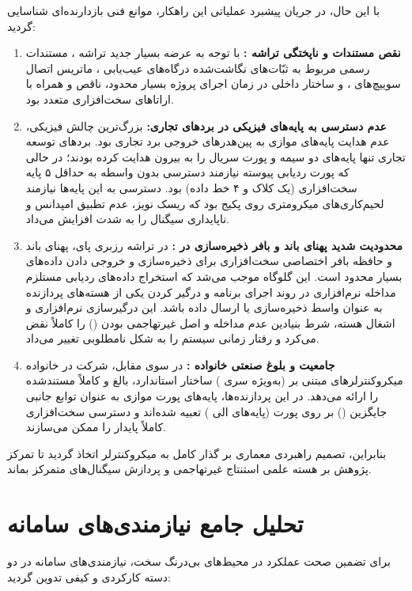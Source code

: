 با این حال، در جریان پیشبرد عملیاتی این راهکار، موانع فنی بازدارنده‌ای شناسایی گردید:
\begin{enumerate}
    \item \textbf{نقص مستندات و ناپختگی تراشه :} با توجه به عرضه بسیار جدید تراشه ، مستندات رسمی مربوط به ثبّات‌های نگاشت‌شده درگاه‌های عیب‌یابی ، ماتریس اتصال سوییچ‌های ، و ساختار داخلی  در زمان اجرای پروژه بسیار محدود، ناقص و همراه با اراتا‌های سخت‌افزاری متعدد بود.
    \item \textbf{عدم دسترسی به پایه‌های فیزیکی  در بردهای تجاری:} بزرگ‌ترین چالش فیزیکی، عدم هدایت پایه‌های موازی  به پین‌هدرهای خروجی برد تجاری  بود. بردهای توسعه تجاری تنها پایه‌های دو سیمه  و پورت سریال  را به بیرون هدایت کرده بودند؛ در حالی که پورت ردیابی پیوسته نیازمند دسترسی بدون واسطه به حداقل ۵ پایه سخت‌افزاری  (یک کلاک و ۴ خط داده) بود. دسترسی به این پایه‌ها نیازمند لحیم‌کاری‌های میکرومتری روی پکیج  بود که ریسک نویز، عدم تطبیق امپدانس و ناپایداری سیگنال را به شدت افزایش می‌داد.
    \item \textbf{محدودیت شدید پهنای باند و بافر ذخیره‌سازی در :} در تراشه رزبری پای، پهنای باند و حافظه بافر اختصاصی سخت‌افزاری برای ذخیره‌سازی و خروجی دادن داده‌های  بسیار محدود است. این گلوگاه موجب می‌شد که استخراج داده‌های ردیابی مستلزم مداخله نرم‌افزاری در روند اجرای برنامه و درگیر کردن یکی از هسته‌های پردازنده به عنوان واسط ذخیره‌سازی یا ارسال داده باشد. این درگیرسازی نرم‌افزاری و اشغال هسته، شرط بنیادین عدم مداخله و اصل غیرتهاجمی بودن () را کاملاً نقض می‌کرد و رفتار زمانی سیستم را به شکل نامطلوبی تغییر می‌داد.
    \item \textbf{جامعیت و بلوغ صنعتی خانواده :} در سوی مقابل، شرکت  در خانواده میکروکنترلرهای مبتنی بر  (به‌ویژه سری ) ساختار استاندارد، بالغ و کاملاً مستندشده  را ارائه می‌دهد. در این پردازنده‌ها، پایه‌های پورت موازی  به عنوان توابع جانبی جایگزین () بر روی پورت  (پایه‌های  الی ) تعبیه شده‌اند و دسترسی سخت‌افزاری کاملاً پایدار را ممکن می‌سازند.
\end{enumerate}

بنابراین، تصمیم راهبردی معماری بر گذار کامل به میکروکنترلر  اتخاذ گردید تا تمرکز پژوهش بر هسته علمی استنتاج غیرتهاجمی و پردازش سیگنال‌های  متمرکز بماند.

\section{تحلیل جامع نیازمندی‌های سامانه}
برای تضمین صحت عملکرد در محیط‌های بی‌درنگ سخت، نیازمندی‌های سامانه در دو دسته کارکردی و کیفی تدوین گردید:

